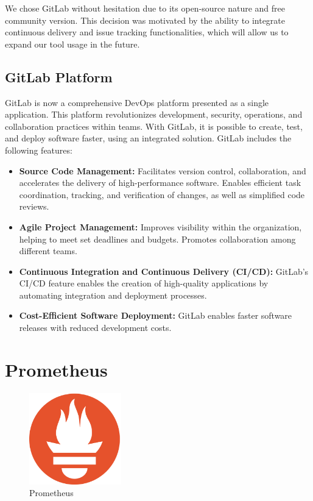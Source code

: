 We chose GitLab without hesitation due to its open-source nature and free community version. This decision was motivated by the ability to integrate continuous delivery and issue tracking functionalities, which will allow us to expand our tool usage in the future.

\subsection*{GitLab Platform}

GitLab is now a comprehensive DevOps platform presented as a single application. This platform revolutionizes development, security, operations, and collaboration practices within teams. With GitLab, it is possible to create, test, and deploy software faster, using an integrated solution. GitLab includes the following features:
\begin{itemize}
    \item \textbf{Source Code Management:} Facilitates version control, collaboration, and accelerates the delivery of high-performance software. Enables efficient task coordination, tracking, and verification of changes, as well as simplified code reviews.
    \item \textbf{Agile Project Management:} Improves visibility within the organization, helping to meet set deadlines and budgets. Promotes collaboration among different teams.
    \item \textbf{Continuous Integration and Continuous Delivery (CI/CD):} GitLab's CI/CD feature enables the creation of high-quality applications by automating integration and deployment processes.
    \item \textbf{Cost-Efficient Software Deployment:} GitLab enables faster software releases with reduced development costs.
\end{itemize}

\section{Prometheus}

\begin{figure}[H]
  \centering
  \includegraphics[width=4cm]{Logos/prometheus-logo.png}
  \caption{Prometheus}
  \label{fig:prometheus_logo}
\end{figure}

